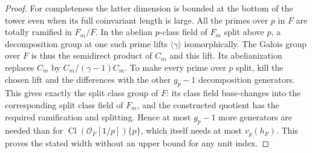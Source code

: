 \documentclass[a4paper,11pt]{article}
\theoremstyle{definition}
\theoremstyle{remark}
\numberwithin{equation}{section}
\newcommand{\Cl}{\operatorname{Cl}}
\begin{document}
\begin{proof}
For completeness the latter dimension is bounded at the
bottom of the tower even when its full coinvariant length
is large. All the primes over \(p\) in \(F\) are totally
ramified in \(F_m/F\). In the abelian \(p\)-class field of
\(F_m\) split above \(p\), a decomposition group at one
such prime lifts \(\langle\gamma\rangle\) isomorphically.
The Galois group over \(F\) is thus the semidirect product
of \(C_m\) and this lift. Its abelianization replaces \(C_m\)
by \(C_m/(\gamma-1)C_m\). To make every prime over \(p\)
split, kill the chosen lift and the differences with the
other \(g_p-1\) decomposition generators. This gives
exactly the split class group of \(F\): its class field
base-changes into the corresponding split class field of
\(F_m\), and the constructed quotient has the required
ramification and splitting. Hence at most \(g_p-1\) more
generators are needed than for \(\Cl(\mathcal O_F[1/p])\{p\}\),
which itself needs at most \(v_p(h_F)\). This proves the
stated width without an upper bound for any unit index.
\end{proof}
\end{document}
